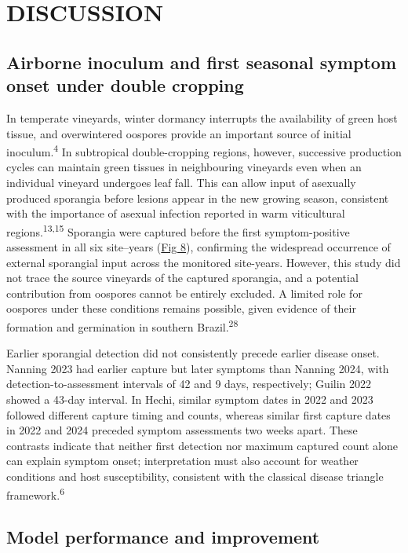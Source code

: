\documentclass{article}
\begin{document}
\section{DISCUSSION}\label{discussion}

\subsection{Airborne inoculum and first seasonal symptom onset under
double cropping}\label{inoculum-dynamics-and-the-drivers-of-first-seasonal-symptom-onset}

In temperate vineyards, winter dormancy interrupts the availability of green
host tissue, and overwintered oospores provide an important source of
initial inoculum.\textsuperscript{4} In subtropical double-cropping regions,
however, successive production cycles can maintain green tissues in
neighbouring vineyards even when an individual vineyard undergoes leaf fall.
This can allow input of asexually produced sporangia before lesions appear
in the new growing season, consistent with the importance of asexual
infection reported in warm viticultural regions.\textsuperscript{13,15}
Sporangia were captured before the first symptom-positive assessment in all
six site--years (\hyperref[_Ref212492136]{Fig 8}), confirming the widespread
occurrence of external sporangial input across the monitored site-years.
However, this study did not trace the source vineyards of the captured
sporangia, and a potential contribution from oospores cannot be entirely
excluded. A limited role for oospores under these conditions remains
possible, given evidence of their formation and germination in southern
Brazil.\textsuperscript{28}

Earlier sporangial detection did not consistently precede earlier disease
onset. Nanning 2023 had earlier capture but later symptoms than Nanning
2024, with detection-to-assessment intervals of 42 and 9 days, respectively;
Guilin 2022 showed a 43-day interval. In Hechi, similar symptom dates in
2022 and 2023 followed different capture timing and counts, whereas similar
first capture dates in 2022 and 2024 preceded symptom assessments two weeks
apart. These contrasts indicate that neither first detection nor maximum
captured count alone can explain symptom onset; interpretation must also
account for weather conditions and host susceptibility, consistent with the
classical disease triangle framework.\textsuperscript{6}

\subsection{Model performance and improvement}\label{model-enhancement}
\end{document}
